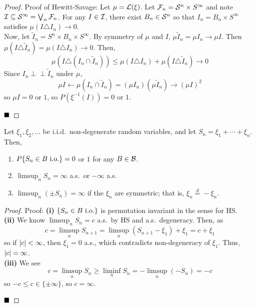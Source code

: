 \begin{proof}{Proof of Hewitt-Savage:}
    Let $\mu = \cal{L}(\xi)$. Let $\cal{F}_n = \cal{S}^{n} \times S^{\infty}$ and note $\cal{I} \subseteq \cal{S}^{\infty} = \bigvee_{n} \cal{F}_n$. For any $I \in \cal{I}$, there exist $B_n \in \cal{S}^{n}$ so that $I_n = B_n \times S^{\infty}$ satisfies $\mu(I \triangle I_n) \to 0$.\\


    Now, let $\tilde{I}_n = S^{n} \times B_n \times S^{\infty}$. By symmetry of $\mu$ and $I$, $\mu\tilde{I}_n = \mu I_n \to \mu I$. Then $\mu(I \triangle \tilde{I}_n) = \mu(I \triangle I_n) \to 0$. Then,
    \[ \mu(I \triangle (I_n \cap \tilde{I}_n)) \leq \mu(I \triangle I_n) + \mu(I \triangle \tilde{I}_n) \to 0 \]
    Since $I_n \perp\!\!\!\perp \tilde{I}_n$ under $\mu$,
    \[ \mu I \leftarrow \mu(I_n \cap \tilde{I}_n) = (\mu I_n)(\mu\tilde{I}_n) \to (\mu I)^2 \]
    so $\mu I = 0$ or $1$, so $P(\xi^{-1}(I)) = 0$ or $1$.

    $\qed$
\end{proof}

\begin{lemma}
    Let $\xi_1, \xi_2, \ldots$ be i.i.d.\ non-degenerate random variables, and let $S_n = \xi_1 + \cdots + \xi_n$. Then,
    \begin{enumerate}[label = (\roman*)]
        \item $P\{S_n \in B \tt{ i.o.}\} = 0$ or $1$ for any $B \in \cal{B}$.
        \item $\limsup_{n} S_n = \infty$ a.s.\ or $-\infty$ a.s.
        \item $\limsup_{n}(\pm S_n) = \infty$ if the $\xi_n$ are symmetric; that is, $\xi_n \overset{d}{=} -\xi_n$.
    \end{enumerate}
\end{lemma}
\begin{proof}{Proof:}
    \textbf{(i)} $\{S_n \in B \tt{ i.o.}\}$ is permutation invariant in the sense for HS.\\

   
    \textbf{(ii)} We know $\limsup_{n} S_n = c$ a.s.\ by HS and a.s.\ degeneracy. Then, as
    \[ c = \limsup_{n} S_{n + 1} = \limsup_{n}(S_{n + 1} - \xi_1) + \xi_1 = c + \xi_1 \]
    so if $\abs{c} < \infty$, then $\xi_1 = 0$ a.s., which contradicts non-degeneracy of $\xi_1$. Thus, $\abs{c} = \infty$.\\

    \textbf{(iii)} We see
    \[ c = \limsup_{n} S_n \geq \liminf_{n} S_n = -\limsup_{n}(-S_n) = -c \]
    so $-c \leq c \in \{\pm\infty\}$, so $c = \infty$.

    $\qed$
\end{proof}


